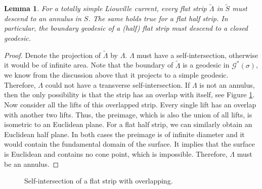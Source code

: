\documentclass[reqno]{amsart}
\theoremstyle{plain}
\newtheorem{lemma}[thm]{Lemma}
\theoremstyle{definition}
\theoremstyle{remark}
\theoremstyle{definition}
\newcommand{\?}{\textcolor{red}{?}}
\newcommand{\Gssigma}{\mathcal{G}^*(\sigma) }
\newcommand{\supp}{\mathrm{supp}\, L_\sigma}
\begin{document}
\begin{lemma}\label{strip}
For a totally simple Liouville current, every flat strip $\tilde{\Lambda}$ in $\tilde{S}$ must descend to an annulus in $S$. The same holds true for a flat half strip. In particular, the boundary geodesic of a (half) flat strip must descend to a closed geodesic.
\end{lemma}
\begin{proof}
Denote the projection of $\tilde{\Lambda}$ by $\Lambda$. $\Lambda$ must have a self-intersection, otherwise it would be of infinite area. Note that the boundary of $\tilde{\Lambda}$ is a geodesic in $\Gssigma$, we know from the discussion above that it projects to a simple geodesic. Therefore, $\Lambda$ could not have a transverse self-intersection. If $\Lambda$ is not an annulus, then the only possibility is that the strip has an overlap with itself, see Figure \ref{horizontal translation}. Now consider all the lifts of this overlapped strip. Every single lift has an overlap with another two lifts. Thus, the preimage, which is also the union of all lifts, is isometric to an Euclidean plane. For a flat half strip, we can similarly obtain an Euclidean half plane. In both cases the preimage is of infinite diameter and it would contain the fundamental domain of the surface. It implies that the surface is Euclidean and contains no cone point, which is impossible. Therefore, $\Lambda$ must be an annulus.
\end{proof}
\begin{figure}[h]
    \centering
    \caption{Self-intersection of a flat strip with overlapping.}
    \label{horizontal translation}
\end{figure}

\end{document}
